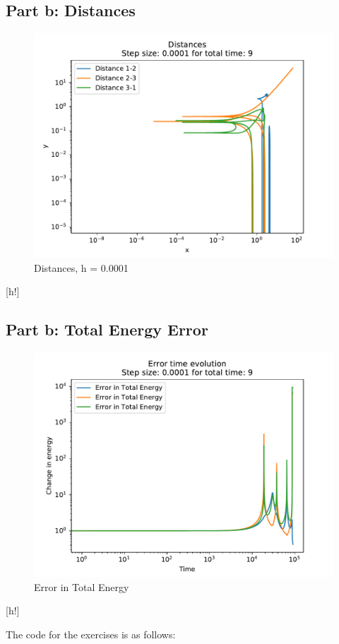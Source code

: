 \documentclass[12pt,a4paper,twoside]{article}
\begin{document}
\subsection*{Part b: Distances}
\begin{figure}[h!]
  \centering
  \includegraphics[]{figs/exercise03_3_stepsize00001_time9.pdf}
  \caption{Distances, h = 0.0001}
\end{figure}[h!]

\subsection*{Part b: Total Energy Error}
\begin{figure}[h!]
  \centering
  \includegraphics[]{figs/exercise03_4_stepsize00001_time9}
  \caption{Error in Total Energy}
\end{figure}[h!]

%
The code for the exercises is as follows:
%
%
\end{document}
